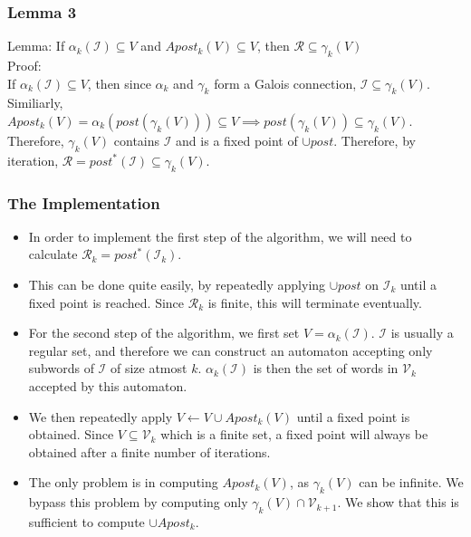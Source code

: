 \documentclass{beamer}
\begin{document}
{        \begin{frame}
            \frametitle{Lemma 3}
            Lemma: If $\alpha_{k}(\mathcal{I}) \subseteq V$ and $Apost_{k}(V) \subseteq V$, then $\mathcal{R} \subseteq \gamma_{k}(V)$\\
            Proof:\\
            If $\alpha_{k}(\mathcal{I}) \subseteq V$, then since $\alpha_{k}$ and $\gamma_{k}$ form a Galois connection, $\mathcal{I} \subseteq \gamma_{k}(V)$.
            Similiarly, $Apost_{k}(V) = \alpha_{k}(post(\gamma_{k}(V))) \subseteq V \implies post(\gamma_{k}(V)) \subseteq \gamma_{k}(V)$. Therefore, $\gamma_{k}(V)$ contains $\mathcal{I}$ 
            and is a fixed point of $\cup post$. Therefore, by iteration, $\mathcal{R} = post^{*}(\mathcal{I}) \subseteq \gamma_{k}(V)$.
        \end{frame}

        \begin{frame}
            \frametitle{The Implementation}
            \begin{itemize}
                \item In order to implement the first step of the algorithm, we will need to calculate $\mathcal{R}_{k} = post^{*}(\mathcal{I}_{k})$.
                \item This can be done quite easily, by repeatedly applying $\cup post$ on $\mathcal{I}_{k}$ until a fixed point is reached. Since $\mathcal{R}_{k}$ is finite, this will terminate eventually.
                \item For the second step of the algorithm, we first set $V = \alpha_{k}(\mathcal{I})$. $\mathcal{I}$ is usually a regular set, and therefore we can construct an automaton accepting only subwords of $\mathcal{I}$ of size atmost $k$. $\alpha_{k}(\mathcal{I})$ is then the set of words in $\mathcal{V}_{k}$ accepted by this automaton. 
                \item We then repeatedly apply $V \leftarrow V \cup Apost_{k}(V)$ until a fixed point is obtained. Since $V \subseteq \mathcal{V}_{k}$ which is a finite set, a fixed point will always be obtained after a finite number of iterations.
                \item The only problem is in computing $Apost_{k}(V)$, as $\gamma_{k}(V)$ can be infinite. We bypass this problem by computing only $\gamma_{k}(V) \cap \mathcal{V}_{k + 1}$. We show that this is sufficient 
                to compute $\cup Apost_{k}$.
            \end{itemize}
        \end{frame}

}
\end{document}
